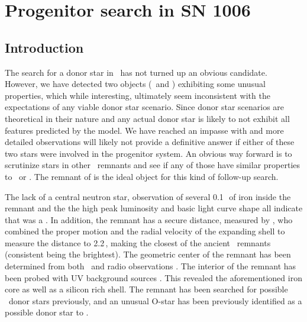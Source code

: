 \chapter{Progenitor search in SN 1006}
\label{chap:sn1006}


\section{Introduction}

The search for a donor star in \ has not turned up an obvious candidate. However, we have detected two objects (\starb\ and \starg) exhibiting some unusual properties, which while interesting, ultimately seem inconsistent with the expectations of any viable donor star scenario. Since donor star scenarios are theoretical in their nature and any actual donor star is likely to not exhibit all features predicted by the model. We have reached an impasse with  and more detailed observations will likely not provide a definitive answer if either of these two stars were involved in the progenitor system. An obvious way forward is to scrutinize stars in other \snia\ remnants and see if any of those have similar properties to \starb\ or \starg. The remnant of  is the ideal object for this kind of follow-up search. 

The lack of a central neutron star, observation of several 0.1\,\msun\ of iron inside the remnant \cite{1997ApJ...481..838H} and the the high peak luminosity and basic light curve shape \citep[visible for several years][]{1965AJ.....70..748G} all indicate that  was a \snia. In addition, the remnant has a secure distance, measured by \citet{2003ApJ...585..324W}, who combined the proper motion and the radial velocity of the expanding shell to measure the distance to 2.2\,\kpc, making  the closest of the ancient \snia\ remnants (consistent  being the brightest).   The geometric center of the remnant has been determined from both \xray\ and radio observations \citep{2003ApJ...585..324W}. The interior of the remnant has been probed with UV background sources \citep{2005ApJ...624..189W}. This revealed the aforementioned iron core as well as a silicon rich shell. The remnant has been searched for possible \snia\ donor stars previously, and an unusual O-star has been previously identified as a possible donor star to .

